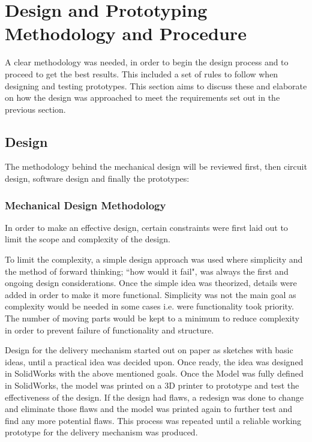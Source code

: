 \documentclass[a4paper,11pt]{article}
\numberwithin{figure}{section}
\numberwithin{table}{section}
\begin{document}
\section[Design and Prototyping Methodology and Procedure]{Design and Prototyping Methodology and Procedure%
}
A clear methodology was needed, in order to begin the design process and to proceed to get the best results. This included a set of rules to follow when designing and testing prototypes. This section aims to discuss these and elaborate on how the design was approached to meet the requirements set out in the previous section.

\subsection{Design}
The methodology behind the mechanical design will be reviewed first, then circuit design, software design and finally the prototypes:
\subsubsection{Mechanical Design Methodology}
In order to make an effective design, certain constraints were first laid out to limit the scope and complexity of the design.

To limit the complexity, a simple design approach was used where simplicity and the method of forward thinking; ``how would it fail", was always the first and ongoing design considerations. Once the simple idea was theorized, details were added in order to make it more functional. Simplicity was not the main goal as complexity would be needed in some cases i.e. were functionality took priority. The number of moving parts would be kept to a minimum to reduce complexity in order to prevent failure of functionality and structure. 

Design for the delivery mechanism started out on paper as sketches with basic ideas, until a practical idea was decided upon. Once ready, the idea was designed in SolidWorks with the above mentioned goals. Once the Model was fully defined in SolidWorks, the model was printed on a 3D printer to prototype and test the effectiveness of the design. If the design had flaws, a redesign was done to change and eliminate those flaws and the model was printed again to further test and find any more potential flaws. This process was repeated until a reliable working prototype for the delivery mechanism was produced.
\end{document}
